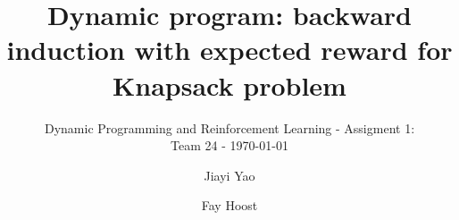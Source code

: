 \documentclass[sigconf]{acmart}
\begin{document}
\title{Dynamic program: backward induction with expected reward for Knapsack problem}
\subtitle{Dynamic Programming and Reinforcement Learning - Assigment 1: \\Team 24 - \today}

\author{Jiayi Yao}

\author{Fay Hoost}
\affiliation{
  \studentID{}
}
\email{}



\maketitle




\end{document}
